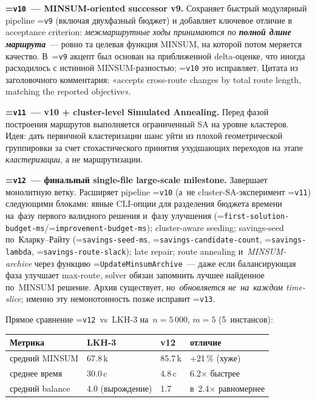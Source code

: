 \documentclass[a4paper,14pt]{extreport}
\makeatletter
\let\old@texttt\texttt
\renewcommand{\texttt}[1]{{\sloppy\hyphenchar\font=\m@ne\old@texttt{#1}}}
\makeatother
\begin{document}
\textbf{\texttt{v10}~--- MINSUM-oriented successor v9.} Сохраняет быстрый модулярный pipeline \texttt{v9} (включая двухфазный бюджет) и добавляет ключевое отличие в acceptance criterion: \emph{межмаршрутные ходы принимаются по \textbf{полной длине маршрута}}~--- ровно та целевая функция MINSUM, на которой потом меряется качество. В~\texttt{v9} акцепт был основан на приближенной delta-оценке, что иногда расходилось с истинной MINSUM-разностью; \texttt{v10} это исправляет. Цитата из заголовочного комментария: «accepts cross-route changes by total route length, matching the reported objective».

\textbf{\texttt{v11}~--- v10 + cluster-level Simulated Annealing.} Перед фазой построения маршрутов выполняется ограниченный SA на уровне кластеров. Идея: дать первичной кластеризации шанс уйти из плохой геометрической группировки за счет стохастического принятия ухудшающих переходов на этапе \emph{кластеризации}, а не маршрутизации.

\textbf{\texttt{v12}~--- финальный single-file large-scale milestone.} Завершает монолитную ветку. Расширяет pipeline \texttt{v10} (а~не cluster-SA-эксперимент \texttt{v11}) следующими блоками: явные CLI-опции для разделения бюджета времени на~фазу первого валидного решения и~фазу улучшения (\texttt{first-solution-budget-ms}/\texttt{improvement-budget-ms}); cluster-aware seeding; savings-seed по~Кларку--Райту (\texttt{savings-seed-ms}, \texttt{savings-candidate-count}, \texttt{savings-lambda}, \texttt{savings-route-slack}); late repair; route annealing и~\emph{MINSUM-archive} через функцию \texttt{UpdateMinsumArchive}~--- даже если балансирующая фаза улучшает max-route, solver обязан запомнить лучшее найденное по~MINSUM решение. Архив существует, но~\emph{обновляется не~на~каждом time-slice}; именно эту немонотонность позже исправит \texttt{v13}.

\medskip
\noindent Прямое сравнение \texttt{v12}~vs~LKH-3 на~$n=5\,000$, $m=5$ (5~инстансов):

\begin{center}\small
\begin{tabular}{|L{2.6cm}|L{2.4cm}|R{1.4cm}|L{3.2cm}|}
\hline
\textbf{Метрика} & \textbf{LKH-3} & \textbf{v12} & \textbf{отличие} \\
\hline
средний MINSUM & 67.8\,k & 85.7\,k & +21\,\% (хуже) \\
\hline
среднее время & 30.0\,c & 4.8\,c & 6.2$\times$ быстрее \\
\hline
средний balance & 4.0 (вырождение) & 1.7 & в~2.4$\times$ равномернее \\
\hline
\end{tabular}
\end{center}
\end{document}
